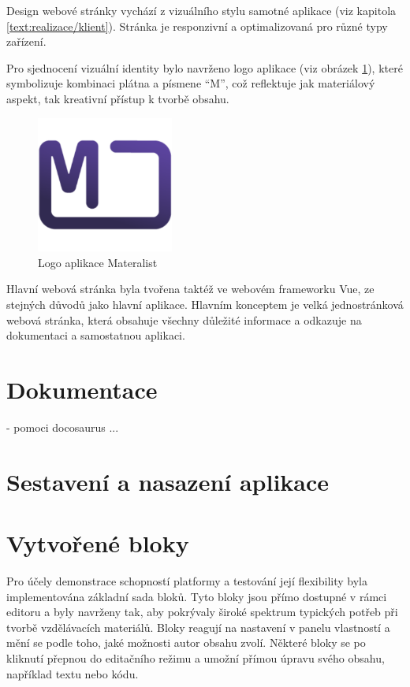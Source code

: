 Design webové stránky vychází z vizuálního stylu samotné aplikace (viz kapitola \ref{text:realizace/klient}). 
Stránka je responzivní a optimalizovaná pro různé typy zařízení.

Pro sjednocení vizuální identity bylo navrženo logo aplikace (viz obrázek \ref{fig:logo}), které symbolizuje kombinaci plátna a písmene \enquote{M}, což reflektuje jak materiálový aspekt, tak kreativní přístup k tvorbě obsahu.

\begin{figure}[ht!]
    \centering
    \includegraphics[width=0.4\textwidth]{media/05_realizace/logo.png}
    \caption{Logo aplikace Materalist}
    \label{fig:logo}
\end{figure}

Hlavní webová stránka byla tvořena taktéž ve webovém frameworku Vue, ze stejných důvodů jako hlavní aplikace.
Hlavním konceptem je velká jednostránková webová stránka, která obsahuje všechny důležité informace a odkazuje na dokumentaci a samostatnou aplikaci.

\section{Dokumentace}

- pomoci docosaurus
...

\section{Sestavení a nasazení aplikace}\label{text:realizace/nasazeni}

\section{Vytvořené bloky}\label{text:realizace/vytvoreneBloky}

Pro účely demonstrace schopností platformy a testování její flexibility byla implementována základní sada bloků.
Tyto bloky jsou přímo dostupné v rámci editoru a byly navrženy tak, aby pokrývaly široké spektrum typických potřeb při tvorbě vzdělávacích materiálů. 
Bloky reagují na nastavení v panelu vlastností a mění se podle toho, jaké možnosti autor obsahu zvolí. 
Některé bloky se po kliknutí přepnou do editačního režimu a umožní přímou úpravu svého obsahu, například textu nebo kódu. 

